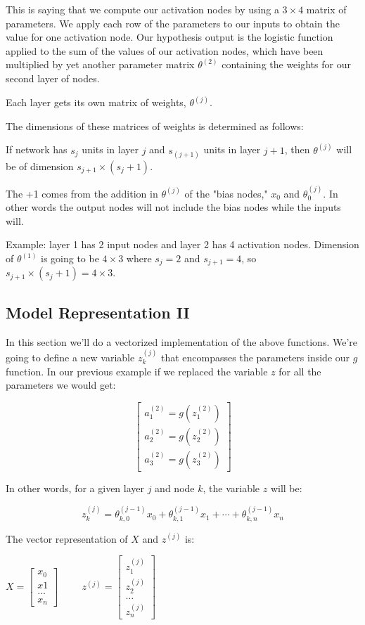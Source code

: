 \documentclass{article}
\begin{document}
This is saying that we compute our activation nodes by using a $3×4$ matrix of parameters. We apply each row of the parameters to our inputs to obtain the value for one activation node. Our hypothesis output is the logistic function applied to the sum of the values of our activation nodes, which have been multiplied by yet another parameter matrix $\theta^{(2)}$ containing the weights for our second layer of nodes.

Each layer gets its own matrix of weights, $\theta^{(j)}$.

The dimensions of these matrices of weights is determined as follows:

If network has $s_j$ units in layer $j$ and $s_{(j+1)}$ units in layer $j+1$, then $\theta^{(j)}$ will be of dimension $s_{j+1}×(s_j+1)$.

The +1 comes from the addition in $\theta^{(j)}$ of the "bias nodes," $x_0$ and $\theta_0^{(j)}$. In other words the output nodes will not include the bias nodes while the inputs will.

Example: layer 1 has 2 input nodes and layer 2 has 4 activation nodes. Dimension of $\theta^{(1)}$ is going to be $4×3$ where $s_j=2$ and $s_{j+1}=4$, so $s_{j+1}×(s_j+1)=4×3$.


\subsection{Model Representation II}

In this section we'll do a vectorized implementation of the above functions. We're going to define a new variable $z_k^{(j)}$ that encompasses the parameters inside our $g$ function. In our previous example if we replaced the variable $z$ for all the parameters we would get:

$$
\begin{bmatrix}
a_1^{(2)}=g(z_1^{(2)}) \\
a_2^{(2)}=g(z_2^{(2)}) \\
a_3^{(2)}=g(z_3^{(2)})
\end{bmatrix}
$$

In other words, for a given layer $j$ and node $k$, the variable $z$ will be:

$$z_k^{(j)}=\theta_{k,0}^{(j−1)}x_0+\theta_{k,1}^{(j−1)}x_1+\cdots +\theta_{k,n}^{(j−1)}x_n$$

The vector representation of $X$ and $z^{(j)}$ is:

$X=\begin{bmatrix}
x_0 \\
x1  \\
\dots \\
x_n
\end{bmatrix}
\hspace{1cm} z^{(j)}=\begin{bmatrix}
z_1^{(j)} \\
z_2^{(j)} \\
\dots \\
z_n^{(j)}
\end{bmatrix}
$
\end{document}
